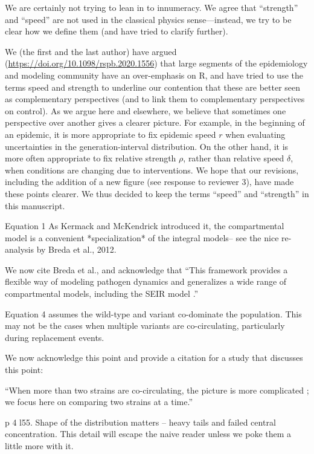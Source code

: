 \documentclass[12pt]{article}
\newcommand{\revtext}{\textsf}
\begin{document}
We are certainly not trying to lean in to innumeracy. We agree that ``strength'' and ``speed'' are not used in the classical physics sense---instead, we try to be clear how we define them (and have tried to clarify further).

We (the first and the last author) have argued (\url{https://doi.org/10.1098/rspb.2020.1556}) that large segments of the epidemiology and modeling community have an over-emphasis on R, and have tried to use the terms speed and strength to underline our contention that these are better seen as complementary perspectives (and to link them to complementary perspectives on control).
As we argue here and elsewhere, we believe that sometimes one perspective over another gives a clearer picture.
For example, in the beginning of an epidemic, it is more appropriate to fix epidemic speed $r$ when evaluating uncertainties in the generation-interval distribution.
On the other hand, it is more often appropriate to fix relative strength $\rho$, rather than relative speed $\delta$, when conditions are changing due to interventions.
We hope that our revisions, including the addition of a new figure (see response to reviewer 3), have made these points clearer.
We thus decided to keep the terms ``speed'' and ``strength'' in this manuscript.

\revtext{Equation 1 As Kermack and McKendrick introduced it, the compartmental model is a convenient *specialization* of the integral models-- see the nice re-analysis by Breda et al., 2012.}

We now cite Breda et al., and acknowledge that ``This framework provides a flexible way of modeling pathogen dynamics and generalizes a wide range of compartmental models, including the SEIR model \citep{heesterbeek1996concept, diekmann2000mathematical, roberts2004modelling, aldis2005integral,breda2012formulation, champredon2018equivalence}.''

\revtext{Equation 4 assumes the wild-type and variant co-dominate the population.  This may not be the cases when multiple variants are co-circulating, particularly during replacement events.}

We now acknowledge this point and provide a citation for a study that discusses this point:

``When more than two strains are co-circulating, the picture is more complicated \citep{campbell2021increased}; we focus here on comparing two strains at a time.''

\revtext{p 4 l55.  Shape of the distribution matters -- heavy tails and failed central concentration.  This detail will escape the naive reader unless we poke them a little more with it.}
\end{document}
